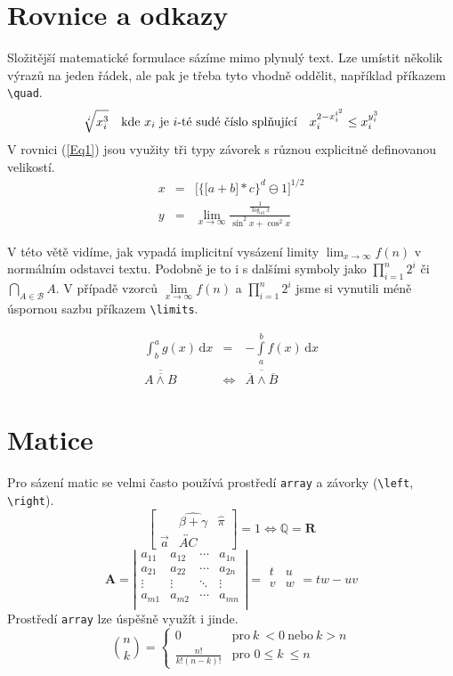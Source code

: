 \documentclass[a4paper, twocolumn, 11pt]{article}
\begin{document}
\section{Rovnice a odkazy}
Složitější matematické formulace sázíme mimo plynulý text. Lze umístit několik výrazů na jeden řádek, ale pak je třeba tyto vhodně oddělit, například příkazem \verb=\quad=.
$$\sqrt[i]{x_i^3} \quad  \textup{kde}\  x_i\  \textup{je}\  i\textup{-té sudé číslo splňující} \quad x_i^{2-x_i^{i^2}} \leq x_i^{y_i^3}$$
\indent
V rovnici (\ref{Eq1}) jsou využity tři typy závorek s různou explicitně definovanou velikostí.
\begin{eqnarray}\label{Eq1}
x & = & \bigg[\Big\{\big[a + b\big] \ast c\Big\}^d \ominus 1\bigg]^{1/2}\\
y & = & \lim_{x \to \infty} \frac{\frac{1}{\log_{10}x}}{\sin^2x + \cos^2x} \nonumber
\end{eqnarray}

\indent
V této větě vidíme, jak vypadá implicitní vysázení limity $\lim_{x \to \infty} f(n)$ v normálním odstavci textu. Podobně je to i s dalšími symboly jako $\prod_{i=1}^n 2^i$ či $\bigcap_{A \in \mathcal{B}} A$. V případě vzorců $\lim\limits_{x \to \infty}f(n)$ a $\prod\limits_{i=1}^n 2^i$ jsme si vynutili méně úspornou sazbu příkazem \verb=\limits=.

\begin{eqnarray}
\int_b^a g(x)\,\mathrm{d}x & = & -\int\limits_a^b f(x)\,\mathrm{d}x\\
\overline{\overline{A \wedge B}} & \Leftrightarrow & \overline{\overline{A} \wedge \overline{B}}
\end{eqnarray}

\section{Matice}
Pro sázení matic se velmi často používá prostředí \texttt{array} a závorky (\verb=\left=, \verb=\right=).
$$
\left[\begin{array}{ccc}
     & \widehat{\beta+ \gamma} & \hat{\pi} \\
  \Vec{a}   & \overleftrightarrow{AC} &
\end{array}\right] =
1 \Longleftrightarrow \mathbb{Q} = \mathbf{R}
$$
$$
\mathbf{A} =
\left|\begin{array}{cccc}
a_{11} & a_{12} & \cdots & a_{1n} \\
a_{21} & a_{22} & \cdots & a_{2n} \\
\vdots & \vdots & \ddots & \vdots \\
a_{m1} & a_{m2} & \cdots & a_{mn} \\
\end{array}\right|
=
\begin{array}{cc}
t & u \\
v & w \\
\end{array}
=
tw - uv
$$
\indent
Prostředí \texttt{array} lze úspěšně využít i jinde.
$$
\binom{n}{k}
=
\left\{ \begin{array}{ll}
    0 &\text{pro}\  k\  < 0\  \text{nebo}\ k > n \\
    \frac{n!}{k!(n - k)!} &\text{pro } 0 \leq k\ \leq n
\end{array}\right.
$$
\end{document}
